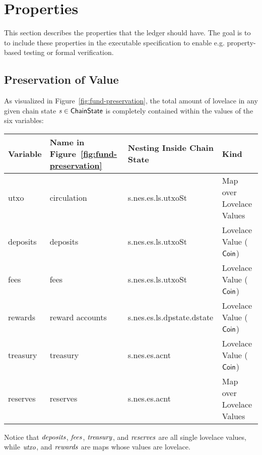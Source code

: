 
\newcommand{\Val}{\fun{Val}}
\newcommand{\POV}[1]{\ensuremath{\mathsf{PresOfVal}(\mathsf{#1})}}
\newcommand{\DBE}[2]{\ensuremath{\mathsf{DBE}({#1},~{#2})}}
\newcommand{\DGO}[2]{\ensuremath{\mathsf{DGO}({#1},~{#2})}}

\section{Properties}
\label{sec:properties}

This section describes the properties that the ledger should have. The goal is to
to include these properties in the executable specification to enable e.g.
property-based testing or formal verification.

\subsection{Preservation of Value}
\label{sec:preservation-of-value}

As visualized in Figure~\ref{fig:fund-preservation},
the total amount of lovelace in any given chain state
$\mathit{s}\in\mathsf{ChainState}$ is completely contained within the values of the six
variables:

\begin{tabular}{||l|l|l|l||}\hline\hline

  \textbf{Variable} & \textbf{Name in Figure~\ref{fig:fund-preservation}}
                    & \textbf{Nesting Inside Chain State} & \textbf{Kind} \\ \hline
  utxo & circulation & s.nes.es.ls.utxoSt & Map over Lovelace Values  \\ \hline
  deposits & deposits &  s.nes.es.ls.utxoSt & Lovelace Value ($\mathsf{Coin}$) \\ \hline
  fees & fees &  s.nes.es.ls.utxoSt & Lovelace Value ($\mathsf{Coin}$) \\ \hline
  rewards & reward accounts & s.nes.es.ls.dpstate.dstate  & Lovelace Value ($\mathsf{Coin}$)  \\ \hline
  treasury & treasury &  s.nes.es.acnt  & Lovelace Value ($\mathsf{Coin}$) \\ \hline
  reserves & reserves & s.nes.es.acnt & Map over Lovelace Values \\ \hline
  \hline
\end{tabular}

\noindent
Notice that $\mathit{deposits}$, $\mathit{fees}$, $\mathit{treasury}$, and $\mathit{reserves}$
are all single lovelace values, while $\mathit{utxo}$, and $\mathit{rewards}$ are
maps whose values are lovelace.

